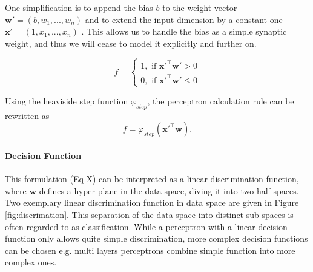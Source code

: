 One simplification is to append the bias $b$ to the weight vector $\textbf{w}' = (b , w_1, ... , w_n)$ and to extend the input dimension by a constant one $\textbf{x}' = (1, x_1 , ... , x_n)$ .
This allows us to handle the bias as a simple synaptic weight, and thus we will cease to  model it explicitly and further on.

\[
	f = 
		\begin{cases}
			1, \text{  if  } \textbf{x}'^\intercal \textbf{w}'> 0  \\
			0, \text{  if  } \textbf{x}'^\intercal \textbf{w}' \le 0
		\end{cases}	
\]



Using the heaviside step function $\varphi_{step}$, the perceptron calculation rule can be rewritten as 
\[
	f = \varphi_{step}(\textbf{x}'^\intercal \textbf{w}) .
\]   

\paragraph{Decision Function}

This formulation (Eq X) can be interpreted as a linear discrimination function, where $\textbf{w}$ defines a hyper plane in the data space, diving it into two half spaces. 
Two exemplary linear discrimination function in data space are given in Figure \ref{fig:discrimation}.
This separation of the data space into distinct sub spaces is often regarded to as classification. 
While a perceptron with a linear decision function only allows quite simple discrimination, more complex decision functions can be chosen e.g. multi layers perceptrons combine simple function into more complex ones. 

